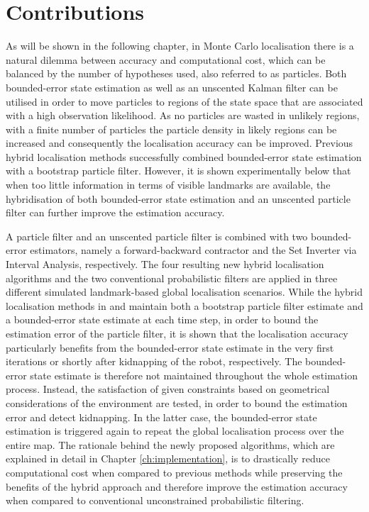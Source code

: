 \section{Contributions} 

As will be shown in the following chapter, in Monte Carlo localisation there is a natural dilemma between accuracy and computational cost, which can be balanced by the number of hypotheses used, also referred to as particles. Both bounded-error state estimation as well as an unscented Kalman filter can be utilised in order to move particles to regions of the state space that are associated with a high observation likelihood. As no particles are wasted in unlikely regions, with a finite number of particles the particle density in likely regions can be increased and consequently the localisation accuracy can be improved. Previous hybrid localisation methods successfully combined bounded-error state estimation with a bootstrap particle filter. However, it is shown experimentally below that when too little information in terms of visible landmarks are available, the hybridisation of both bounded-error state estimation and an unscented particle filter can further improve the estimation accuracy. %

 A particle filter and an unscented particle filter is combined with two bounded-error estimators, namely a forward-backward contractor and the Set Inverter via Interval Analysis, respectively. The four resulting new hybrid localisation algorithms and the two conventional probabilistic filters are applied in three different simulated landmark-based global localisation scenarios. While the hybrid localisation methods in \cite{neulandh_ybridazation} and \cite{neuland_set_inversion} maintain both a bootstrap particle filter estimate and a bounded-error state estimate at each time step, in order to bound the estimation error of the particle filter, it is shown that the localisation accuracy particularly benefits from the bounded-error state estimate in the very first iterations or shortly after kidnapping of the robot, respectively. The bounded-error state estimate is therefore not maintained throughout the whole estimation process. Instead, the satisfaction of given constraints based on geometrical considerations of the environment are tested, in order to bound the estimation error and detect kidnapping. In the latter case, the bounded-error state estimation is triggered again to repeat the global localisation process over the entire map. The rationale behind the newly proposed algorithms, which are explained in detail in Chapter \ref{ch:implementation}, is to drastically reduce computational cost when compared to previous methods while preserving the benefits of the hybrid approach and therefore improve the estimation accuracy when compared to conventional unconstrained probabilistic filtering.
 

